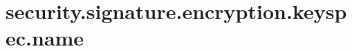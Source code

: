 \section{security.signature.encryption.keyspec.name}
\label{configuration:SecuritySignatureEncryptionKeyspecName}
\TODO
